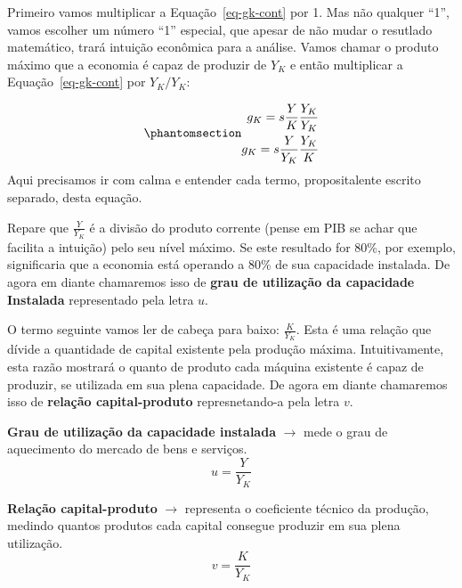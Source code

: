 \documentclass[
  brazilian,
  letterpaper,
  DIV=11,
  numbers=noendperiod]{scrreprt}
\begin{document}
Primeiro vamos multiplicar a Equação~\ref{eq-gk-cont} por 1. Mas não
qualquer ``1'', vamos escolher um número ``1'' especial, que apesar de
não mudar o resutlado matemático, trará intuição econômica para a
análise. Vamos chamar o produto máximo que a economia é capaz de
produzir de \(Y_K\) e então multiplicar a Equação~\ref{eq-gk-cont} por
\(Y_K / Y_K\):

\begin{equation}\protect\phantomsection\label{eq-gk-cont2}{
\begin{aligned}
g_K = s \frac{Y}{K} \frac{Y_K}{Y_K}\\
g_K = s \frac{Y}{Y_K} \frac{Y_K}{K}
\end{aligned}}\end{equation} Aqui precisamos ir com calma e entender
cada termo, propositalente escrito separado, desta equação.

Repare que \(\frac{Y}{Y_K}\) é a divisão do produto corrente (pense em
PIB se achar que facilita a intuição) pelo seu nível máximo. Se este
resultado for 80\%, por exemplo, significaria que a economia está
operando a 80\% de sua capacidade instalada. De agora em diante
chamaremos isso de \textbf{grau de utilização da capacidade Instalada}
representado pela letra \(u\).

O termo seguinte vamos ler de cabeça para baixo: \(\frac{K}{Y_K}\). Esta
é uma relação que dívide a quantidade de capital existente pela produção
máxima. Intuitivamente, esta razão mostrará o quanto de produto cada
máquina existente é capaz de produzir, se utilizada em sua plena
capacidade. De agora em diante chamaremos isso de \textbf{relação
capital-produto} represnetando-a pela letra \(v\).

\begin{tcolorbox}[enhanced jigsaw, arc=.35mm, bottomrule=.15mm, bottomtitle=1mm, breakable, colback=white, colbacktitle=quarto-callout-warning-color!10!white, colframe=quarto-callout-warning-color-frame, coltitle=black, left=2mm, leftrule=.75mm, opacityback=0, opacitybacktitle=0.6, rightrule=.15mm, title=\textcolor{quarto-callout-warning-color}{\faExclamationTriangle}\hspace{0.5em}{Definições}, titlerule=0mm, toprule=.15mm, toptitle=1mm]

\textbf{Grau de utilização da capacidade instalada} \(\rightarrow\) mede
o grau de aquecimento do mercado de bens e serviços.
\[ u=\frac{Y}{Y_K} \]

\textbf{Relação capital-produto} \(\rightarrow\) representa o
coeficiente técnico da produção, medindo quantos produtos cada capital
consegue produzir em sua plena utilização. \[ v = \frac{K}{Y_K}\]

\end{tcolorbox}
\end{document}
